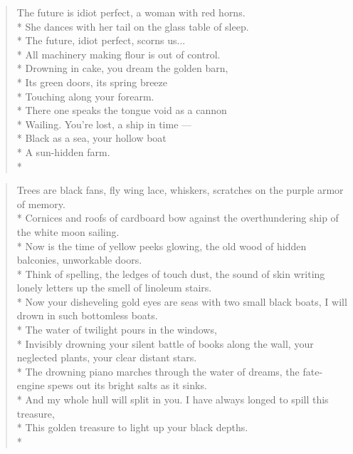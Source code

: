 \documentclass[english,11pt,letterpaper,onecolumn]{scrbook}
\begin{document}
\begin{verse}
The future is idiot perfect, a woman with red horns.  \\*
She dances with her tail on the glass table of sleep.  \\*
The future, idiot perfect, scorns us...  \\*
All machinery making flour is out of control.  \\*
Drowning in cake, you dream the golden barn,  \\*
Its green doors, its spring breeze  \\*
Touching along your forearm.  \\*
There one speaks the tongue void as a cannon  \\*
Wailing.  You're lost, a ship in time ---  \\*
Black as a sea, your hollow boat  \\*
A sun-hidden farm. \\*
\end{verse}

\newpage
{}

\begin{verse}
Trees are black fans, fly wing lace, whiskers, scratches on the purple armor of memory.  \\*
Cornices and roofs of cardboard bow against the overthundering ship of the white moon sailing.  \\*
Now is the time of yellow peeks glowing, the old wood of hidden balconies, unworkable doors.  \\*
Think of spelling, the ledges of touch dust, the sound of skin writing lonely letters up the smell of linoleum stairs.  \\*
Now your disheveling gold eyes are seas with two small black boats, I will drown in such bottomless boats.  \\*
The water of twilight pours in the windows,  \\*
Invisibly drowning your silent battle of books along the wall, your neglected plants, your clear distant stars.  \\*
The drowning piano marches through the water of dreams, the fate-engine spews out its bright salts as it sinks.  \\*
And my whole hull will split in you.  I have always longed to spill this treasure,  \\*
This golden treasure to light up your black depths. \\*
\end{verse}
\end{document}
